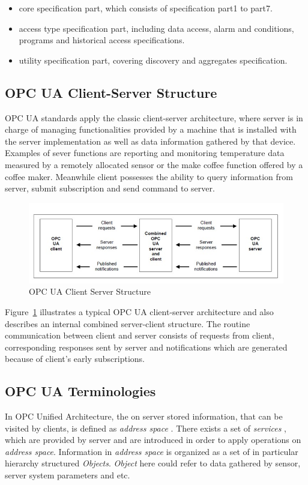 \begin{itemize}
\item core specification part, which consists of specification part1 to part7.
\item access type specification part, including data access, alarm and conditions, programs and historical access specifications.
\item utility specification part, covering discovery and aggregates specification.
\end{itemize}


\subsection{OPC UA Client-Server Structure}
OPC UA standards apply the classic client-server architecture, where server is in charge of managing functionalities provided by a machine that is installed with the server implementation as well as data information gathered by that device. Examples of sever functions are reporting and monitoring temperature data measured by a remotely allocated sensor or the make coffee function offered by a coffee maker. Meanwhile client possesses the ability to query information from server, submit subscription and send command to server.

\begin{figure}[!htbp]
	\centering
	\includegraphics[width=1.00\textwidth]{cs.jpg}
		\caption{OPC UA Client Server Structure \cite{O1}}
	\label{fig:cs}
\end{figure}
Figure~\ref{fig:cs} illustrates a typical OPC UA client-server architecture and also describes an internal combined server-client structure. The routine communication between client and server consists of requests from client, corresponding responses sent by server and notifications which are generated because of client's early subscriptions.

\subsection{OPC UA Terminologies}
In OPC Unified Architecture, the on server stored information, that can be visited by clients, is defined as \emph{address space} \cite{O3}. There exists a set of \emph{services} \cite{O4}, which are provided by server and are introduced in order to apply operations on \emph{address space}. Information in \emph{address space} is organized as a set of in particular hierarchy structured \emph{Objects}. \emph{Object} here could refer to data gathered by sensor, server system parameters and etc. 

